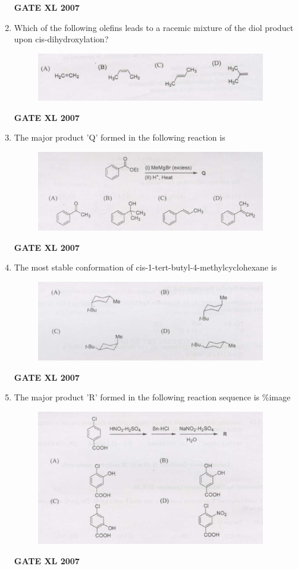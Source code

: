\documentclass[journal,12pt,onecolumn]{IEEEtran}
\begin{document}
\begin{enumerate}[resume]
	    \hfill \textbf{GATE XL 2007}
    \item Which of the following olefins leads to a racemic mixture of the diol product upon cis-dihydroxylation? %
    \begin{figure}[h!]
	\centering
	\includegraphics[width=10cm]{18}
	\caption*{}
	\label{fig:Q18}
	\end{figure} 
	    \hfill \textbf{GATE XL 2007}
\clearpage
    \item The major product 'Q' formed in the following reaction is%
    \begin{figure}[h!]
	\centering
	\includegraphics[width=10cm]{19}
	\caption*{}
	\label{fig:Q19}
	\end{figure} 
	    \hfill \textbf{GATE XL 2007}

    \item The most stable conformation of cis-1-tert-butyl-4-methylcyclohexane is 
    \begin{figure}[h!]
	\centering
	\includegraphics[width=10cm]{20}
	\caption*{}
	\label{fig:Q20}
	\end{figure} 
	    \hfill \textbf{GATE XL 2007}

    \item The major product 'R' formed in the following reaction sequence is \%image 
    \begin{figure}[h!]
	\centering
	\includegraphics[width=10cm]{21}
	\caption*{}
	\label{fig:Q21}
	\end{figure} 
	    \hfill \textbf{GATE XL 2007}


\end{enumerate}
\end{document}
